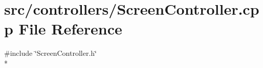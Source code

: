 \section{src/controllers/\-Screen\-Controller.cpp File Reference}
\label{_screen_controller_8cpp}
{\ttfamily \#include \char`\"{}Screen\-Controller.\-h\char`\"{}}\\*
